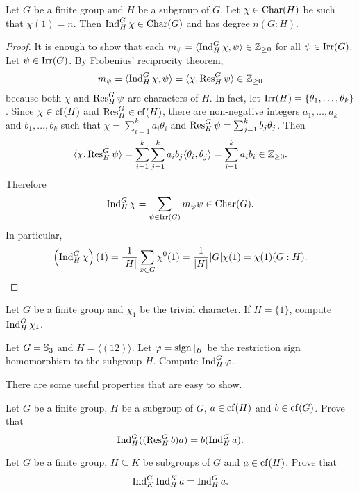 \begin{corollary}
\label{cor:reciprocity}
    Let $G$ be a finite group and $H$ be a subgroup of $G$. 
    Let $\chi\in\operatorname{Char}(H)$ be such that 
    $\chi(1)=n$. Then 
    $\operatorname{Ind}_H^G\chi\in\operatorname{Char}(G)$ and 
    has degree $n(G:H)$. 
\end{corollary}

\begin{proof}
    It is enough to show that
    each $m_\psi=\langle\operatorname{Ind}_H^G\chi,\psi\rangle\in\mathbb{Z}_{\geq0}$ 
    for all $\psi\in\operatorname{Irr}(G)$. Let $\psi\in\operatorname{Irr}(G)$. By 
    Frobenius' reciprocity theorem, 
    \[
    m_\psi=\langle\operatorname{Ind}_H^G\chi,\psi\rangle
    =\langle\chi,\operatorname{Res}_H^G\psi\rangle\in\mathbb{Z}_{\geq0}
    \]
    because both $\chi$ and $\operatorname{Res}_H^G\psi$ are
    characters of $H$. In fact, let $\operatorname{Irr}(H)=\{\theta_1,\dots,\theta_k\}$. Since $\chi\in\operatorname{cf}(H)$ and 
    $\operatorname{Res}_H^G\in\operatorname{cf}(H)$, there are 
    non-negative integers $a_1,\dots,a_k$ and $b_1,\dots,b_k$ such that
    $\chi=\sum_{i=1}^ka_i\theta_i$ and 
    $\operatorname{Res}_H^G\psi=\sum_{j=1}^kb_j\theta_j$. Then
    \[
\langle\chi,\operatorname{Res}_H^G\psi\rangle=\sum_{i=1}^k\sum_{j=1}^ka_ib_j\langle\theta_i,\theta_j\rangle=\sum_{i=1}^ka_ib_i\in\mathbb{Z}_{\geq0}.
    \]
    Therefore   
    \[
    \operatorname{Ind}_H^G\chi=\sum_{\psi\in\operatorname{Irr}(G)}m_{\psi}\psi\in\operatorname{Char}(G). 
    \]
    In particular, 
    \[
    \left(\operatorname{Ind}_H^G\chi\right)(1)=\frac{1}{|H|}\sum_{x\in G}\chi^0(1)=\frac{1}{|H|}|G|\chi(1)=\chi(1)(G:H).\qedhere 
    \]
\end{proof}

\begin{exercise}
    Let $G$ be a finite group and $\chi_1$ be
    the trivial character. If $H=\{1\}$, compute
    $\operatorname{Ind}_H^G\chi_1$. 
\end{exercise}

\begin{exercise}
    Let $G=\mathbb{S}_3$ and $H=\langle (12)\rangle$. 
    Let $\varphi=\operatorname{sign}|_H$ be the restriction sign homomorphism 
    to the subgroup $H$. Compute 
    $\operatorname{Ind}_H^G\varphi$. 
\end{exercise}

There are some useful properties that are easy to show. 

\begin{exercise}
    Let $G$ be a finite group, $H$ be a subgroup of $G$, 
    $a\in\operatorname{cf}(H)$ and $b\in\operatorname{cf}(G)$. Prove that 
    \[
    \operatorname{Ind}_H^G((\operatorname{Res}_H^Gb)a)=b(\operatorname{Ind}_H^Ga).
    \]
\end{exercise}

\begin{exercise}
    Let $G$ be a finite group, $H\subseteq K$ be 
    subgroups of $G$ and $a\in\operatorname{cf}(H)$. 
    Prove that 
    \[
    \operatorname{Ind}_K^G\operatorname{Ind}_H^Ka=\operatorname{Ind}_H^Ga.
    \]
\end{exercise}

